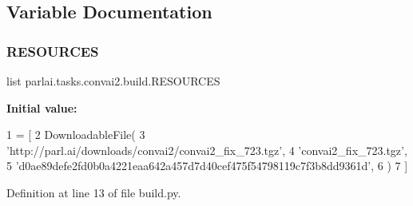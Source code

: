 \subsection{Variable Documentation}
\mbox{\label{namespaceparlai_1_1tasks_1_1convai2_1_1build_a45995413b2766f076c1e1759a89009a6}} 
\subsubsection{\texorpdfstring{R\+E\+S\+O\+U\+R\+C\+ES}{RESOURCES}}
{\footnotesize\ttfamily list parlai.\+tasks.\+convai2.\+build.\+R\+E\+S\+O\+U\+R\+C\+ES}

{\bfseries Initial value\+:}
\begin{DoxyCode}
1 =  [
2     DownloadableFile(
3         \textcolor{stringliteral}{'http://parl.ai/downloads/convai2/convai2\_fix\_723.tgz'},
4         \textcolor{stringliteral}{'convai2\_fix\_723.tgz'},
5         \textcolor{stringliteral}{'d0ae89defe2fd0b0a4221eaa642a457d7d40cef475f54798119c7f3b8dd9361d'},
6     )
7 ]
\end{DoxyCode}


Definition at line 13 of file build.\+py.


